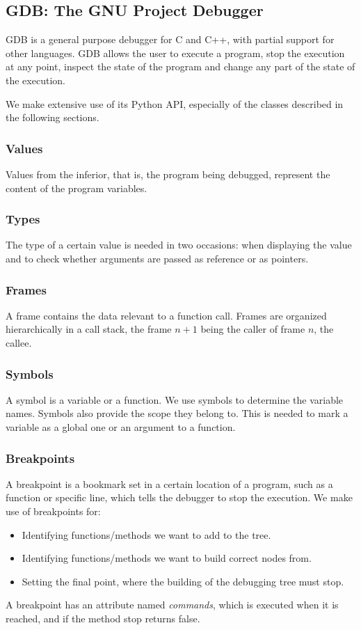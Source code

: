 \subsection{GDB: The GNU Project Debugger}
GDB \cite{gdb} is a general purpose debugger for C and C++, with partial support for other languages. GDB allows the user to execute a program, stop the execution at any point, inspect the state of the program and change any part of the state of the execution.

We make extensive use of its Python API, especially of the classes described in the following sections.

\subsubsection{Values}
Values from the inferior, that is, the program being debugged, represent the content of the program variables.
\subsubsection{Types}
The type of a certain value is needed in two occasions: when displaying the value and to check whether arguments are passed as reference or as pointers.
\subsubsection{Frames}
A frame contains the data relevant to a function call.
Frames are organized hierarchically in a call stack, the frame \(n+1\) being the caller of frame \(n\), the callee.
\subsubsection{Symbols}
A symbol is a variable or a function. We use symbols to determine the variable names. Symbols also provide the scope they belong to. This is needed to mark a variable as a global one or an argument to a function. 
\subsubsection{Breakpoints}
A breakpoint is a bookmark set in a certain location of a program, such as a function or specific line, which tells the debugger to stop the execution.
We make use of breakpoints for:
\begin{itemize}
    \item Identifying functions/methods we want to add to the tree.
    \item Identifying functions/methods we want to build correct nodes from.
    \item Setting the final point, where the building of the debugging tree must stop.
\end{itemize}
A breakpoint has an attribute named \emph{commands}, which is executed when it is reached, and if the method stop returns false.

